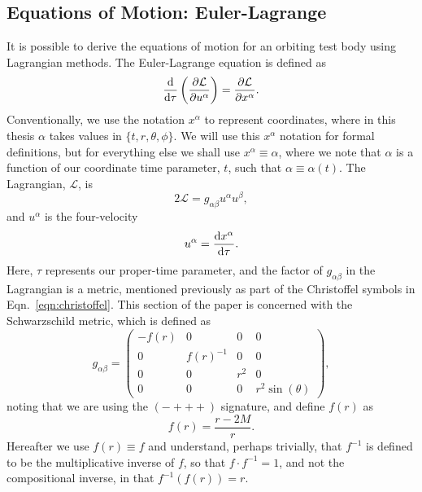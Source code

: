 \subsection{Equations of Motion: Euler-Lagrange}
It is possible to derive the equations of motion for an orbiting test body using Lagrangian methods.
The Euler-Lagrange equation is defined as \cite{eulerLagrange}
\begin{equation}
\dv{\tau} \left(\frac{\partial \mathcal{L}}{\partial u^\alpha} \right)=\frac{\partial \mathcal{L}}{\partial x^\alpha}.
\end{equation}
Conventionally, we use the notation $x^\alpha$ to represent coordinates, where in this thesis $\alpha$ takes values in $\{t,r,\theta,\phi\}$.
We will use this $x^\alpha$ notation for formal definitions, but for everything else we shall use $x^\alpha\equiv\alpha$, where we note that $\alpha$ is a function of our coordinate time parameter, $t$, such that $\alpha\equiv\alpha(t)$.
The Lagrangian, $\mathcal{L}$, is \cite{chandraBook}
\begin{equation}\label{eqn:stdlagrangian}
2\mathcal{L}=g_{\alpha\beta}u^\alpha u^\beta,
\end{equation}
and $u^\alpha$ is the four-velocity
\begin{equation}
u^\alpha = \dv{x^\alpha}{\tau}.
\end{equation}
Here, $\tau$ represents our proper-time parameter, and the factor of $g_{\alpha\beta}$ in the Lagrangian is a metric, mentioned previously as part of the Christoffel symbols in Eqn.~\eqref{eqn:christoffel}.
This section of the paper is concerned with the Schwarzschild metric, which is defined as \cite{schwarz1916}
\begin{equation}\label{eqn:schwarzMet}
g_{\alpha\beta}=
\begin{pmatrix}
    -f(r) & 0 & 0 & 0\\
    0 & f(r)^{-1} & 0 & 0\\
    0 & 0 & r^2 & 0\\
    0 & 0 & 0 & r^2\sin(\theta)
\end{pmatrix},
\end{equation}
noting that we are using the $(-+++)$ signature, and define $f(r)$ as
\begin{equation}
f(r)=\frac{r-2M}{r}.
\end{equation}
Hereafter we use $f(r)\equiv f$ and understand, perhaps trivially, that $f^{-1}$ is defined to be the multiplicative inverse of $f$, so that $f\cdot f^{-1}=1$, and not the compositional inverse, in that $f^{-1}(f(r))=r$.
